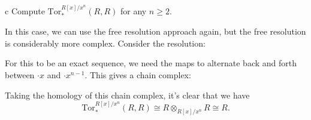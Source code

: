 \documentclass[11pt,letterpaper]{article}
\providecommand{\Tor}{\text{Tor}}
\begin{document}
\begin{solution}
    \begin{partproblem}{c}
        Compute $\mathrm{Tor}_*^{R[x] /x^n}(R, R)$ for any $n\geq 2$.
    \end{partproblem}
    \quad In this case, we can use the free resolution approach again, but the free resolution is considerably more complex. Consider the resolution:
    \begin{center}
    \end{center}
    For this to be an exact sequence, we need the maps to alternate back and forth between $\cdot x$ and $\cdot x^{n-1}$. This gives a chain complex:
    \begin{center}
    \end{center}
    Taking the homology of this chain complex, it's clear that we have
    \[
        \Tor^{R[x] /x^n}_*(R, R) \cong R\otimes_{R[x] /x^n} R \cong R
    .\] 
\end{solution}
\end{document}
